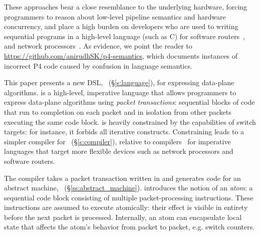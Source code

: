 These approaches bear a close resemblance to the underlying hardware, forcing
programmers to reason about low-level pipeline semantics and hardware
concurrency, and place a high burden on developers who are used to writing
sequential programs in a high-level language (such as C) for software
routers~\cite{click}, and network processors~\cite{packetc, ixp, microenginec,
nova}. As evidence, we point the reader to
\url{https://github.com/anirudhSK/p4-semantics}, which documents instances of
incorrect P4 code caused by confusion in language semantics.



This paper presents a new DSL, \pktlanguage~(\S\ref{s:language}), for
expressing data-plane algorithms. \pktlanguage is a high-level, imperative
language that allows programmers to express data-plane algorithms using {\em
packet transactions}: sequential blocks of code that run to completion on each
packet and in isolation from other packets executing the same code block.
\pktlanguage is heavily constrained by the capabilities of switch targets: for
instance, it forbids all iterative constructs. Constraining \pktlanguage leads
to a simpler compiler for \pktlanguage~(\S\ref{s:compiler}), relative to
compilers~\cite{ixp} for imperative languages that target more flexible devices
such as network processors and software routers.

The \pktlanguage compiler takes a packet transaction written in \pktlanguage
and generates code for an abstract machine,
\absmachine~(\S\ref{ss:abstract_machine}).  \absmachine introduces the notion
of an \textit{atom}: a sequential code block consisting of multiple
packet-processing instructions. These instructions are assumed to execute
atomically: their effect is visible in entirety before the next packet is
processed. Internally, an atom can encapsulate local state that affects the
atom's behavior from packet to packet, e.g.  switch counters.

